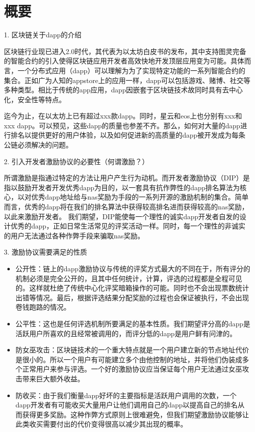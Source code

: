 \section{概要}

1. 区块链关于dapp的介绍 

区块链行业现已进入2.0时代，其代表为以太坊白皮书的发布\cite{buterin2014next}，其中支持图灵完备的智能合约的引入使得区块链应用开发者高效快地开发顶层应用变为可能。具体而言，一个分布式应用（dapp）可以理解为为了实现特定功能的一系列智能合约的集合。正如广为人知的appstore上的应用一样，dapp可以包括游戏、赌博、社交等多种类型。相比于传统的app应用，dapp因嵌套于区块链技术故同时具有去中心化，安全性等特点。

迄今为止，在以太坊上已有超过xxx款dapp。同时，星云和eos上也分别有xxx和xxx dapp。可以预见，这些dapp的质量也参差不齐。那么，如何对大量的dapp进行排名以提供更好的用户体验，以及如何促进新的高质量的dapp被开发成为每条公链必须解决的问题。

2. 引入开发者激励协议的必要性（何谓激励？）

所谓激励是指通过特定的方法让用户产生行为动机。而开发者激励协议（DIP）是指以鼓励开发者开发优秀dapp为目的，以一套具有抗作弊性的dapp排名算法为核心，以对优秀dapp地址给与nas奖励为手段的一系列开源的激励机制的集合。简单而言，优秀的dapp将在我们的排名算法中获得较高排名进而获得较高的nas奖励，以此来激励开发者。 我们期望，DIP能使每一个理性的诚实dapp开发者自发的设计优秀的dapp，正如日常生活常见的评奖活动一样。同时，每一个理性的非诚实的用户无法通过各种作弊手段来骗取nas奖励。


3. 激励协议需要满足的性质
\begin{itemize}
	\item 公开性：链上的dapp激励协议与传统的评奖方式最大的不同在于，所有评分的机制必须是完全公开的，且其中任何统计，计算，评选的过程都是全程可见的。这样就杜绝了传统中心化评奖暗箱操作的可能。同时也不会出现票数统计出错等情况。最后，根据评选结果分配奖励的过程也会保证被执行，不会出现卷钱跑路的情况。
	\item 公平性：这也是任何评选机制所要满足的基本性质。我们期望评分高的dapp是活跃用户所喜欢的且经常被调用的，而评分低的dapp是用户鲜有问津的。
	\item 防女巫攻击：区块链技术的一个重大特点就是一个用户建立新的节点地址代价是很小的。所以一个用户有可能建立多个由他控制的地址，并将他们伪装成多个正常用户来参与评选。一个好的激励协议应当保证每个用户无法通过女巫攻击带来巨大额外收益。
	\item 防收买：由于我们衡量dapp好坏的主要指标是活跃用户调用的次数，一个dapp开发者有可能收买大量用户让他们调用自己的dapp以提高自己的排名从而获得更多奖励。这种作弊方式原则上很难避免，但我们期望激励协议能够让此类收买需要付出的代价变得很高以减少其出现的概率。
\end{itemize}

